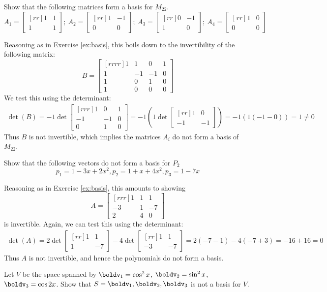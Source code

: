 \ii Show that the following matrices form a basis for $M_{22}$.
$$
A_1=\begin{bmatrix}[rr]
1&1\\
1&1
\end{bmatrix}
; \ 
A_2=\begin{bmatrix}[rr]
1&-1\\
0&0
\end{bmatrix}
; \ 
A_3=\begin{bmatrix}[rr]
0&-1\\
1&0
\end{bmatrix}
; \ 
A_4=\begin{bmatrix}[rr]
1&0\\
0&0
\end{bmatrix}
$$
\begin{solution} Reasoning as in Exercise \ref{ex:basis}, this boils down to the invertibility of the following matrix:
$$
B=
\begin{bmatrix}[rrrr]
1&1&0&1\\
1&-1&-1&0\\
1&0&1&0\\
1&0&0&0
\end{bmatrix}
$$
We test this using the determinant: 
\begin{eqnarray*}
\det(B) = -1\det
\begin{bmatrix}[rrr]
1&0&1\\
-1&-1&0\\
0&1&0
\end{bmatrix}
= -1\left(1\det
\begin{bmatrix}[rr]
1&0\\
-1&-1
\end{bmatrix}\right)
=-1(1(-1-0)) = 1 \neq 0
\end{eqnarray*}
Thus $B$ is not invertible, which implies the matrices $A_i$ do not form a basis of $M_{22}$. 
\end{solution}
\ii Show that the following vectors do not form a basis for $P_2$
$$
p_1=1-3x+2x^2, p_2=1+x+4x^2, p_3=1 - 7x
$$
\begin{solution} Reasoning as in Exercise \ref{ex:basis}, this amounts to showing 
$$A =
\begin{bmatrix}[rrr]
1&1&1\\
-3&1&-7\\
2&4&0
\end{bmatrix}
$$
is invertible. Again, we can test this using the determinant: 
\begin{eqnarray*}
\det(A) = 2\det
\begin{bmatrix}[rr]
1&1\\
1&-7
\end{bmatrix}
-4\det
\begin{bmatrix}[rr]
1&1\\
-3&-7
\end{bmatrix}
= 2(-7-1) -4(-7+3) = -16 + 16 = 0
\end{eqnarray*}
Thus $A$ is not invertible, and hence the polynomials do not form a basis. 
\end{solution}
\ii Let $V$ be the space spanned by $\boldv_1 = \cos^2x$, $\boldv_2 = \sin^2x$, $\boldv_3=\cos2x$.
\bb
\ii Show that $S = {\boldv_1,\boldv_2,\boldv_3}$ is not a basis for $V$.

